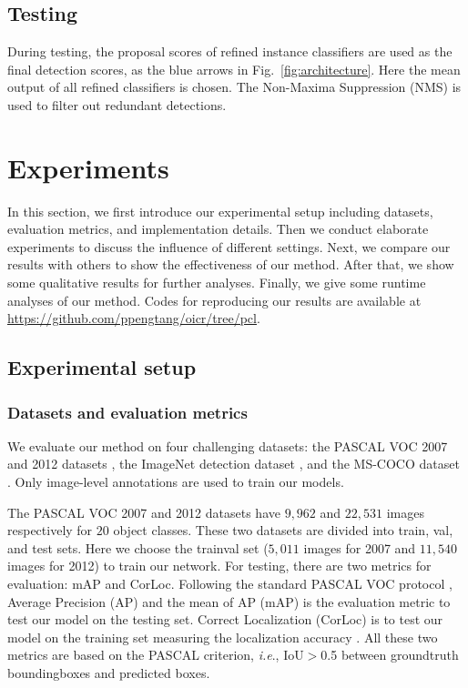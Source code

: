 \documentclass[10pt,journal,compsoc]{IEEEtran}
\def\ie{\emph{i.e}.} \def\Ie{\emph{I.e}.}
\begin{document}
\subsection{Testing}

During testing,
the proposal scores of refined instance classifiers are used as the final detection scores,
as the blue arrows in Fig.~\ref{fig:architecture}.
Here the mean output of all refined classifiers is chosen.
The Non-Maxima Suppression (NMS) is used to filter out redundant detections.



\section{Experiments}
\label{sec:exp}

In this section, we first introduce our experimental setup including datasets, evaluation metrics, and implementation details.
Then we conduct elaborate experiments to discuss the influence of different settings.
Next, we compare our results with others to show the effectiveness of our method.
After that, we show some qualitative results for further analyses.
{Finally, we give some runtime analyses of our method.
Codes for reproducing our results are available at \url{https://github.com/ppengtang/oicr/tree/pcl}.}


\subsection{Experimental setup}
\label{sec:exp_setup}


\subsubsection{Datasets and evaluation metrics}
We evaluate our method on four challenging datasets: the PASCAL VOC 2007 and 2012 datasets \cite{Ref:Everingham2015}, the ImageNet detection dataset \cite{Ref:Russakovsky2015}, {and the MS-COCO dataset \cite{Ref:Lin2014}}.
Only image-level annotations are used to train our models.

The PASCAL VOC 2007 and 2012 datasets have $9,962$ and $22,531$ images respectively for $20$ object classes.
These two datasets are divided into train, val, and test sets.
Here we choose the trainval set ($5,011$ images for 2007 and $11,540$ images for 2012) to train our network.
For testing, there are two metrics for evaluation: mAP and CorLoc.
Following the standard PASCAL VOC protocol \cite{Ref:Everingham2015},
Average Precision (AP) and the mean of AP (mAP) is the evaluation metric to test our model on the testing set.
Correct Localization (CorLoc) is to test our model on the training set measuring the localization accuracy \cite{Ref:Deselaers2012}.
All these two metrics are based on the PASCAL criterion, \ie, IoU$>$0.5 between groundtruth boundingboxes and predicted boxes.
\end{document}
